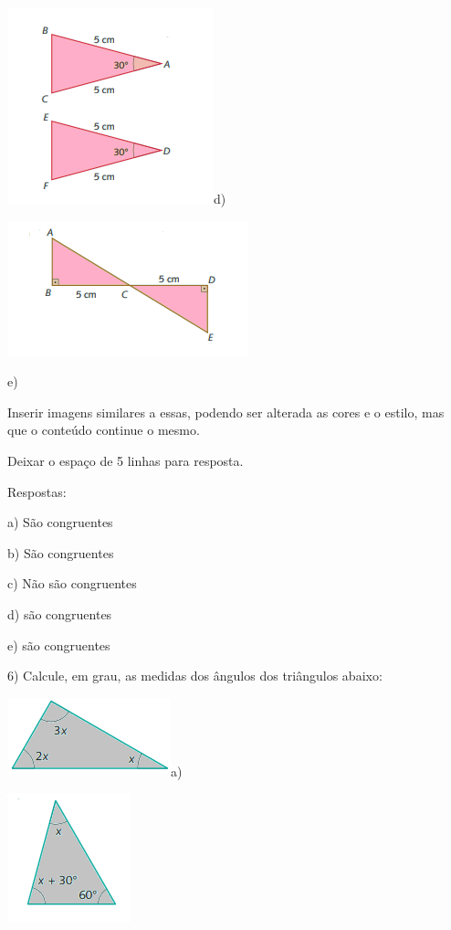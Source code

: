 {\includegraphics[width=2.35417in,height=2.23958in]{./imgSAEB_8_MAT/media/image22.png}d)

\includegraphics[width=2.73958in,height=1.54167in]{./imgSAEB_8_MAT/media/image23.png}

e)

Inserir imagens similares a essas, podendo ser alterada as cores e o
estilo, mas que o conteúdo continue o mesmo.

Deixar o espaço de 5 linhas para resposta.

Respostas:

a) São congruentes

b) São congruentes

c) Não são congruentes

d) são congruentes

e) são congruentes

6) Calcule, em grau, as medidas dos ângulos dos triângulos abaixo:

\includegraphics[width=1.86458in,height=0.89583in]{./imgSAEB_8_MAT/media/image24.png}a)

\includegraphics[width=1.40625in,height=1.47917in]{./imgSAEB_8_MAT/media/image25.png}

}
